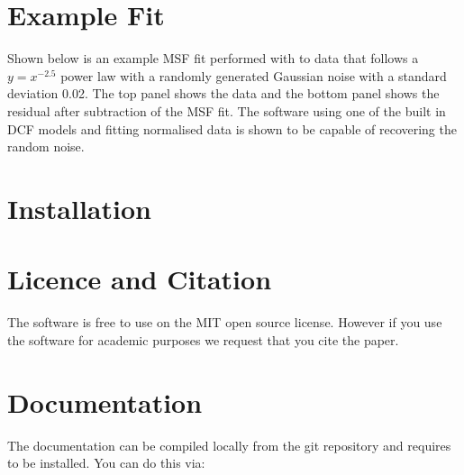 \documentclass[letterpaper,10pt,english]{sphinxmanual}
\let\sphinxpxdimen\pdfpxdimen\else\newdimen\sphinxpxdimen
\begin{document}
\section{Example Fit}
\label{\detokenize{source/intro:example-fit}}
Shown below is an example MSF fit performed with  to data that
follows a \({y = x^{-2.5}}\) power law with a randomly generated Gaussian
noise with a standard deviation 0.02. The top panel shows the data and the
bottom panel shows the residual
after subtraction of the MSF fit. The software using one of the built in DCF models
and fitting normalised data is shown to be capable of recovering the
random noise.

\noindent{\hspace*{\fill}\sphinxincludegraphics[width=400\sphinxpxdimen]{{README}.png}\hspace*{\fill}}


\section{Installation}
\label{\detokenize{source/intro:installation}}

\section{Licence and Citation}
\label{\detokenize{source/intro:licence-and-citation}}
The software is free to use on the MIT open source license. However if you use
the software for academic purposes we request that you cite the 
paper.

\begin{sphinxVerbatim}[commandchars=\\\{\}]
       
\end{sphinxVerbatim}


\section{Documentation}
\label{\detokenize{source/intro:documentation}}
The documentation can be compiled locally from the git repository and requires
 to be installed.
You can do this via:

\begin{sphinxVerbatim}[commandchars=\\\{\}]
 
 
\end{sphinxVerbatim}
\end{document}
